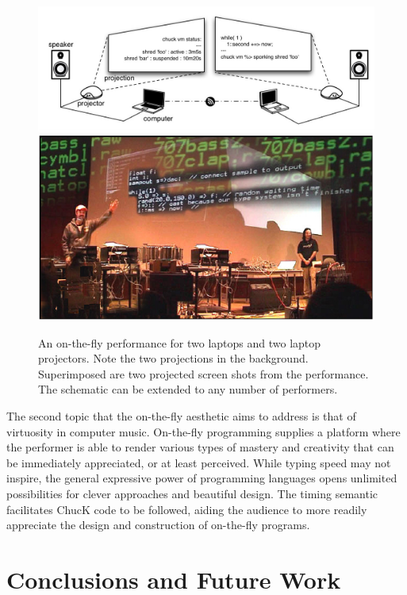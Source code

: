 \begin{figure}[t]
\centering
\includegraphics[width=\textwidth]{img-2-eps-converted-to-crop.pdf}
\includegraphics[width=\textwidth]{img-3-eps-converted-to-crop.pdf}
\caption{An on-the-fly performance for two laptops and two laptop
projectors. Note the two projections in the background.  Superimposed are two
projected screen shots from the performance. The schematic can be extended to any
number of performers.}
\label{Wang:img-8}
\end{figure}


The second topic that the on-the-fly aesthetic aims to address is that of
virtuosity in computer music.  On-the-fly programming supplies a platform where
the performer is able to render various types of mastery and creativity that can
be immediately appreciated, or at least perceived.  While typing speed may not
inspire, the general expressive power of programming languages opens unlimited
possibilities for clever approaches and beautiful design.  The timing semantic
facilitates ChucK code to be followed, aiding the audience to more readily
appreciate the design and construction of on-the-fly programs.

\section{Conclusions and Future Work}

